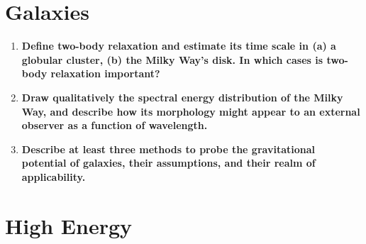 \documentclass[12pt, letterpaper, preprint]{aastex}
\begin{document}
\section*{Galaxies}

\begin{enumerate}

\item \textbf{Define two-body relaxation and estimate its time scale in (a) a globular cluster, (b) the Milky Way's disk. In which cases is two-body relaxation important?}

\item \textbf{Draw qualitatively the spectral energy distribution of the Milky Way, and describe how its morphology might appear to an external observer as a function of wavelength.}

\item \textbf{Describe at least three methods to probe the gravitational potential of galaxies, their assumptions, and their realm of applicability.}

\end{enumerate}

\section*{High Energy}
\end{document}
